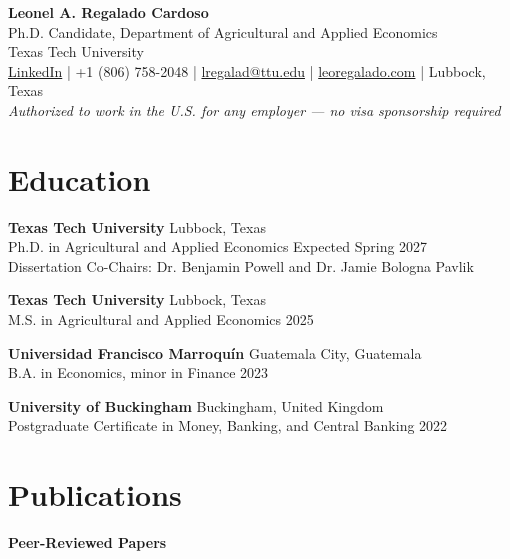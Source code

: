 \documentclass[11pt]{article}
\begin{document}
\begin{center}
    {\LARGE \textbf{Leonel A. Regalado Cardoso}}\\[6pt]
    Ph.D. Candidate, Department of Agricultural and Applied Economics\\
    Texas Tech University\\[4pt]
    \href{https://www.linkedin.com/in/leonel-regalado/}{LinkedIn} \;|\;
    +1 (806) 758-2048 \;|\;
    \href{mailto:lregalad@ttu.edu}{lregalad@ttu.edu} \;|\;
    \href{https://leoregalado.com}{leoregalado.com} \;|\;
    Lubbock, Texas\\[4pt]
    \textit{Authorized to work in the U.S. for any employer --- no visa sponsorship required}
\end{center}

\vspace{0.2in}

\section*{Education}

\textbf{Texas Tech University} \hfill Lubbock, Texas\\
Ph.D. in Agricultural and Applied Economics \hfill Expected Spring 2027\\
Dissertation Co-Chairs: Dr. Benjamin Powell and Dr. Jamie Bologna Pavlik

\vspace{4pt}
\textbf{Texas Tech University} \hfill Lubbock, Texas\\
M.S. in Agricultural and Applied Economics \hfill 2025

\vspace{4pt}
\textbf{Universidad Francisco Marroquín} \hfill Guatemala City, Guatemala\\
B.A. in Economics, minor in Finance \hfill 2023

\vspace{4pt}
\textbf{University of Buckingham} \hfill Buckingham, United Kingdom\\
Postgraduate Certificate in Money, Banking, and Central Banking \hfill 2022

\section*{Publications}

\textbf{Peer-Reviewed Papers}
\end{document}
